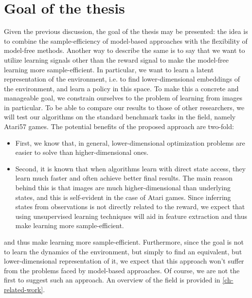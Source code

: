 \section{Goal of the thesis}
\label{sec-thesis-goal}
Given the previous discussion, the goal of the thesis may be presented:
the idea is to combine the sample-efficiency of model-based approaches
with the flexibility of model-free methods.
Another way to describe the same is to say that we want
to utilize learning signals other than the reward signal
to make the model-free learning more sample-efficient.
In particular, we want to learn a latent representation of the environment,
i.e. to find lower-dimensional embeddings of the environment,
and learn a policy in this space.
To make this a concrete and manageable goal,
we constrain ourselves to the problem of learning from images in particular.
To be able to compare our results to those of other researchers,
we will test our algorithms on the standard benchmark tasks in the field,
namely Atari57 games.
The potential benefits of the proposed approach are two-fold:
 \begin{itemize}
    \item First, we know that, in general, lower-dimensional optimization 
			problems are easier to solve than higher-dimensional ones.
    \item Second, it is known that when algorithms learn with direct state access, 
			they learn much faster and often achieve better final results.
    The main reason behind this is that images are much 
	higher-dimensional than underlying states, 
	and this is self-evident in the case of Atari games. 
	Since inferring states from observations is not directly related to the reward,
	we expect that using unsupervised learning techniques will aid in 
	feature extraction and thus make learning more sample-efficient.
\end{itemize}
and thus make learning more sample-efficient.
Furthermore, since the goal is not to learn the dynamics of the environment,
but simply to find an equivalent, but lower-dimensional representation of it,
we expect that this approach won't suffer from the problems faced
by model-based approaches.
Of course, we are not the first to suggest such an approach.
An overview of the field is provided in \ref{ch-related-work}.

